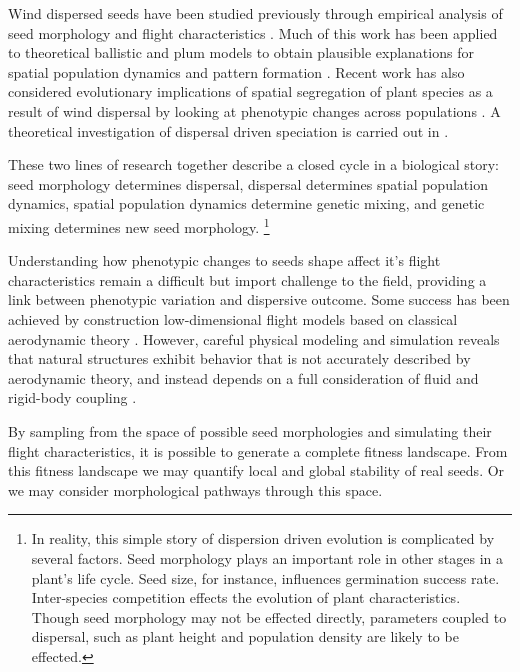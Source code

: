 \documentclass[annual]{acmsiggraph}
\begin{document}
Wind dispersed seeds have been studied previously through empirical analysis of seed morphology and flight characteristics \cite{augspurger1986}.  Much of this work has been applied to  theoretical ballistic and plum models  to obtain plausible explanations for spatial population dynamics and pattern formation \cite{levin2003}. Recent work has also considered  evolutionary implications of spatial segregation of  plant species as a result of wind dispersal by looking at phenotypic changes across  populations \cite{Cheptou2008}.   A theoretical investigation of dispersal driven speciation is carried out in \cite{levin2010}. 

These two lines of research together  describe a closed cycle in a biological story: seed morphology determines  dispersal, dispersal determines spatial population dynamics, spatial population dynamics determine genetic mixing, and genetic mixing determines new seed morphology.  \footnote{In reality, this simple story of dispersion driven evolution is complicated by several factors. Seed morphology  plays an important  role in  other stages in a plant's life cycle. Seed size, for instance, influences germination success rate.  Inter-species competition effects  the evolution of plant characteristics.   Though seed morphology may not be effected directly, parameters coupled to dispersal, such as plant height and population density are likely to be effected.}


Understanding how phenotypic changes to seeds shape affect it's flight characteristics remain a difficult but import challenge to the field, providing a link between phenotypic variation and dispersive outcome.  Some success has been achieved by construction low-dimensional flight models based on classical aerodynamic theory \cite{greene2005}.  However, careful physical modeling and simulation reveals that natural structures exhibit behavior that is not accurately described by aerodynamic theory, and instead depends on a full consideration of fluid and rigid-body coupling \cite{wang2005}\cite{wang2012}.  






By sampling from the space of possible seed morphologies and simulating their flight characteristics, it is possible to generate a complete fitness landscape.  From this fitness landscape we may quantify local and global stability of real seeds.  Or we may consider morphological pathways through this space.  
 
\end{document}
